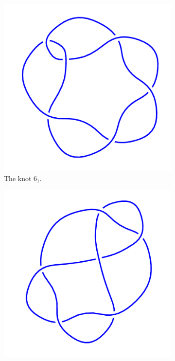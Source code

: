 \documentclass[12pt,letterpaper]{article}
\theoremstyle{definition}
\begin{document}
\begin{figure}[h]
    \centering
    \begin{subfigure}{.3\textwidth}
        \centering
        \includegraphics[width=\textwidth]{rgp08pics/6_1.png}
        \caption{The knot $6_1$.}
    \end{subfigure}
    \quad
    \begin{subfigure}{.3\textwidth}
        \centering
        \includegraphics[width=\textwidth]{rgp08pics/6_2.png}

\end{subfigure}
\end{figure}
\end{document}
